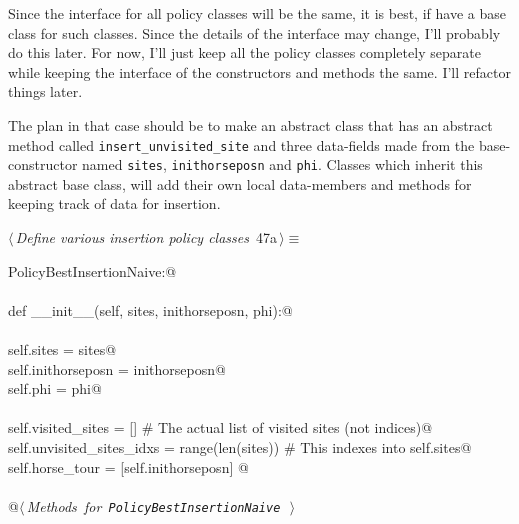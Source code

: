 \documentclass[11.5pt]{report}
\begin{document}
\newchunk Since the interface for all policy classes will be the same, it is 
best, if have a base class for such classes. Since the details of 
the interface may change, I'll probably do this later. For now, 
I'll just keep all the policy classes completely separate while 
keeping the interface of the constructors and methods the same. 
I'll refactor things later. 

The plan in that case should be to make an abstract class that 
has an abstract method called \texttt{insert\_unvisited\_site}
and three data-fields made from the base-constructor named \texttt{sites}, \texttt{inithorseposn}
and \texttt{phi}. Classes which inherit this abstract base class, will 
add their own local data-members and methods for keeping track of 
data for insertion. 

\begin{flushleft} \small\label{scrap67}\raggedright\small
{} $\langle\,${\itshape Define various insertion policy classes}\nobreak\ {\footnotesize {47a}}$\,\rangle\equiv$
\vspace{-1ex}
\begin{list}{}{} \item
\mbox{}\verb@class PolicyBestInsertionNaive:@\\
\mbox{}\verb@@\\
\mbox{}\verb@    def __init__(self, sites, inithorseposn, phi):@\\
\mbox{}\verb@@\\
\mbox{}\verb@         self.sites           = sites@\\
\mbox{}\verb@         self.inithorseposn   = inithorseposn@\\
\mbox{}\verb@         self.phi             = phi@\\
\mbox{}\verb@@\\
\mbox{}\verb@         self.visited_sites        = []                # The actual list of visited sites (not indices)@\\
\mbox{}\verb@         self.unvisited_sites_idxs = range(len(sites)) # This indexes into self.sites@\\
\mbox{}\verb@         self.horse_tour           = [self.inithorseposn]         @\\
\mbox{}\verb@@\\
\mbox{}\verb@    @\hbox{$\langle\,${\itshape Methods for \verb|PolicyBestInsertionNaive|}\nobreak\ {\footnotesize {}}$\,\rangle$}\verb@@\\
\mbox{}\verb@@{\NWsep}
\end{list}

\end{flushleft}
\end{document}
